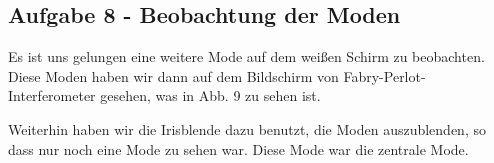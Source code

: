 \subsection{Aufgabe 8 - Beobachtung der Moden}

Es ist uns gelungen eine weitere Mode auf dem weißen Schirm zu beobachten. Diese Moden haben wir dann auf dem Bildschirm von Fabry-Perlot-Interferometer gesehen, was in Abb. 9 zu sehen ist.


Weiterhin haben wir die Irisblende dazu benutzt, die Moden auszublenden, so dass nur noch eine Mode zu sehen war. Diese Mode war die zentrale Mode.